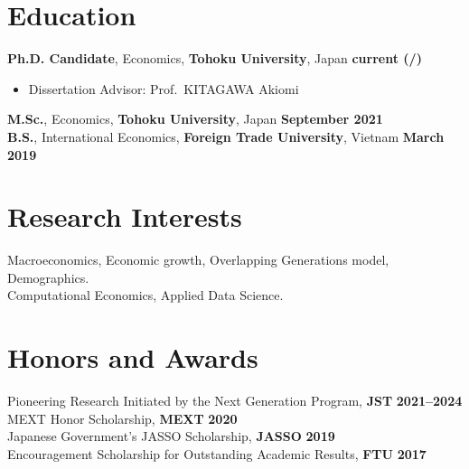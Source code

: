 \documentclass[margin,line]{res}
\begin{document}
\newcommand{\myname}{TRAN Quang-Thanh}
\newlength{\mynamewidth}
\settowidth{\mynamewidth}{\namefont\myname}

\name{\hspace*{0.5\textwidth}\hspace{-0.5\mynamewidth} \myname \vspace*{.1in}}
\thispagestyle{empty}

\begin{resume}




\section{\sc Education}
{\bf Ph.D. Candidate}, Economics, {\bf Tohoku University}, Japan \hfill {\bf current (\the\month/\the\year{}) }\\
\vspace*{-.1in}
\begin{itemize}
	\item[ ] Dissertation Advisor: Prof.\ KITAGAWA Akiomi
\end{itemize}

{\bf M.Sc.}, Economics, {\bf Tohoku University}, Japan \hfill {\bf September 2021}\\

{\bf B.S.}, International Economics, {\bf Foreign Trade University}, Vietnam \hfill {\bf March 2019}\\


\section{\sc Research Interests}
	Macroeconomics, Economic growth, Overlapping Generations model, Demographics.\\
	Computational Economics, Applied Data Science. \\

\vspace{-1em}

\section{\sc Honors and Awards}
Pioneering Research Initiated by the Next Generation Program, {\bf JST} \hfill {\bf 2021--2024}\\
MEXT Honor Scholarship, {\bf MEXT} \hfill {\bf 2020}\\
Japanese Government's JASSO Scholarship, {\bf JASSO} \hfill {\bf 2019}\\
Encouragement Scholarship for Outstanding Academic Results, {\bf FTU} \hfill {\bf 2017}\\


\end{resume}
\end{document}
